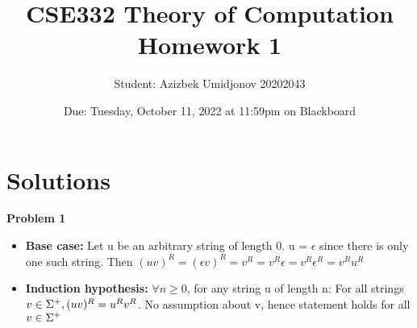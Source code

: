 \documentclass{article}
\title{CSE332 Theory of Computation \\ Homework 1}
\author{Student: Azizbek Umidjonov 20202043}
\date{Due: Tuesday, October 11, 2022 at 11:59pm on Blackboard}
\begin{document}
\maketitle

\section*{Solutions} 

\noindent \textbf{Problem 1}
\begin{itemize}
\item \textbf{Base case:} Let u be an arbitrary string of length 0. u = {$\epsilon$} since there is only one such string. Then $(uv)^{R} = (\epsilon v)^R = v^R = v^R \epsilon = v^R \epsilon^R =  v^{R}u^{R}$
\item \textbf{Induction hypothesis:} {$\forall n \ge 0$}, for any string u of length n:
For all strings {$v \in \Sigma^{+}, (uv)^R = u^R v^R$}. No assumption about v, hence statement holds for all {$v \in \Sigma^{+}$}
\end{itemize}
    
\end{document}
